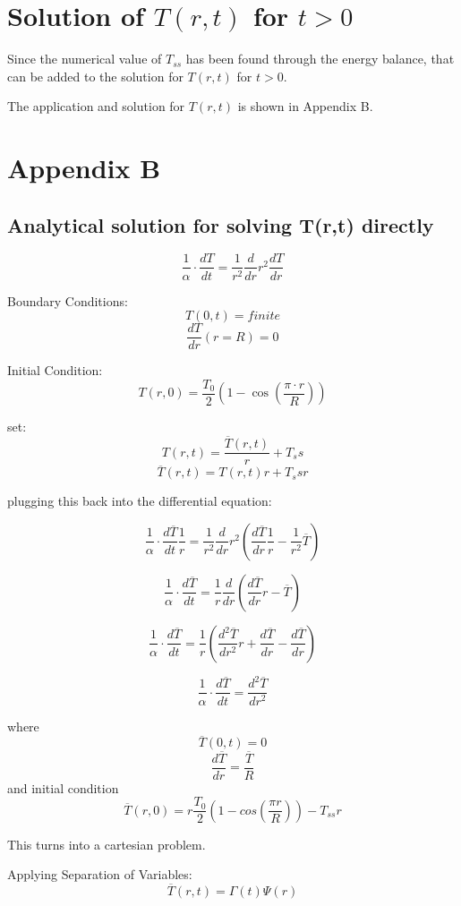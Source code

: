 \documentclass[12pt,letterpaper]{article}
\begin{document}
{\section{Solution of $T(r,t)$ for $t > 0$}
Since the numerical value of $T_{ss}$ has been found
through the energy balance, that can be added to the solution
for $T(r,t)$ for $t>0$.

The application and solution for $T(r,t)$ is shown in Appendix B.

\pagebreak
\section{Appendix B}

\subsection{Analytical solution for solving T(r,t) directly}

\[\frac{1}{\alpha} \cdot \frac{dT}{dt} = \frac{1}{r^2} \frac{d}{dr} r^2 \frac{dT}{dr}\]

Boundary Conditions:
\[T(0,t) = finite \]
\[\frac{dT}{dr} (r = R) = 0 \]

Initial Condition:
\[T(r,0) = \frac{T_0}{2} (1-\cos{(\frac{\pi \cdot r}{R})}) \]

set:
\[T(r,t) = \frac{\overline{T} (r,t)}{r} +T_ss\]
\[\overline{T} (r,t) = T(r,t) r + T_ss r\]

plugging this back into the differential equation:

\[\frac{1}{\alpha} \cdot \frac{d\overline{T}}{dt} \frac{1}{r} = \frac{1}{r^2} \frac{d}{dr} r^2 (\frac{d\overline{T}}{dr} \frac{1}{r} - \frac{1}{r^2} \overline{T}) \]

\[\frac{1}{\alpha} \cdot \frac{d\overline{T}}{dt} = \frac{1}{r} \frac{d}{dr} (\frac{d\overline{T}}{dr} r - \overline{T}) \]

\[\frac{1}{\alpha} \cdot \frac{d\overline{T}}{dt} = \frac{1}{r} (\frac{d^2\overline{T}}{dr^2} r + \frac{d\overline{T}}{dr} - \frac{d\overline{T}}{dr}) \]

\[\frac{1}{\alpha} \cdot \frac{d\overline{T}}{dt} = \frac{d^2\overline{T}}{dr^2} \]

where 
\[\overline{T}(0,t) = 0 \]
\[\frac{d\overline{T}}{dr} = \frac{\overline{T}}{R}\]
and initial condition
\[\overline{T} (r,0) = r \frac{T_0}{2} (1- cos(\frac{\pi r}{R})) - T_{ss} r\]

This turns into a cartesian problem.

Applying Separation of Variables:
\[\overline{T}(r,t) = \Gamma (t) \Psi (r)  \]

}
\end{document}
